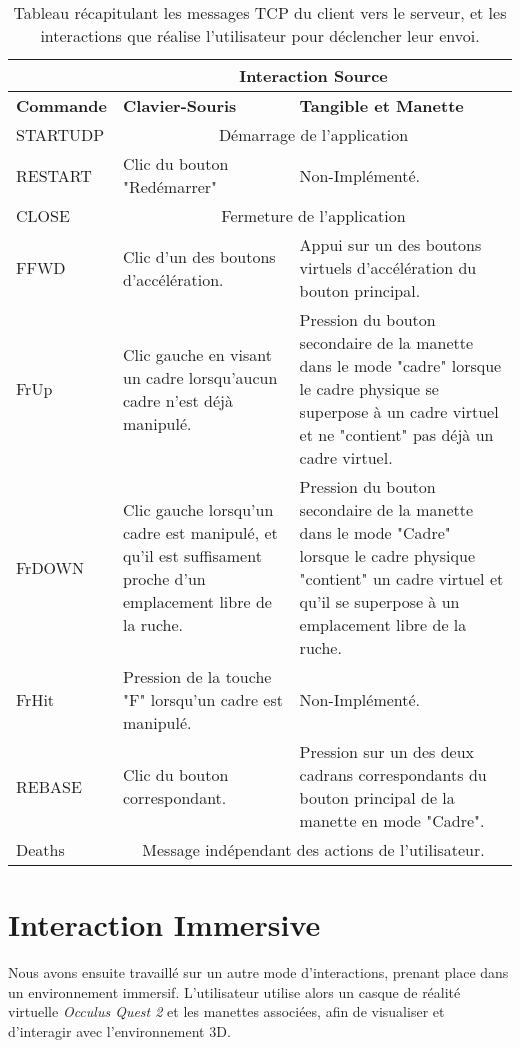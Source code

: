 	\begin{table}
		\begin{tabularx}{\textwidth}{|l|p{4.5cm}|X|}
		\hline
		 & \multicolumn{2}{c|}{\textbf{Interaction Source}}\\
		 \hline
		 \textbf{Commande} & \textbf{Clavier-Souris} & \textbf{Tangible et Manette}\\
		 \hline
		 STARTUDP & \multicolumn{2}{c|}{Démarrage de l'application}\\
		 \hline
		 RESTART & Clic du bouton "Redémarrer" & Non-Implémenté.\\
		 \hline
		 CLOSE & \multicolumn{2}{c|}{Fermeture de l'application}\\
		 \hline
		 FFWD & Clic d'un des boutons d'accélération. & Appui sur un des boutons virtuels d'accélération du bouton principal.\\
		 \hline
		 FrUp & Clic gauche en visant un cadre lorsqu'aucun cadre n'est déjà manipulé. & Pression du bouton secondaire de la manette dans le mode "cadre" lorsque le cadre physique se superpose à un cadre virtuel et ne "contient" pas déjà un cadre virtuel.\\
		 \hline
		 FrDOWN & Clic gauche lorsqu'un cadre est manipulé, et qu'il est suffisament proche d'un emplacement libre de la ruche. & Pression du bouton secondaire de la manette dans le mode "Cadre" lorsque le cadre physique "contient" un cadre virtuel et qu'il se superpose à un emplacement libre de la ruche.\\
		 \hline
		 FrHit & Pression de la touche "F" lorsqu'un cadre est manipulé. & Non-Implémenté.\\
		 \hline
		 REBASE & Clic du bouton correspondant. & Pression sur un des deux cadrans correspondants du bouton principal de la manette en mode "Cadre".\\
		 \hline
		 Deaths & \multicolumn{2}{c|}{Message indépendant des actions de l'utilisateur.}\\
		 \hline 
		\end{tabularx}
	\caption{Tableau récapitulant les messages TCP du client vers le serveur, et les interactions que réalise l'utilisateur pour déclencher leur envoi.}
	\label{tabTotalInterClient}
	\end{table}
		
		
		
	\section{Interaction Immersive}
	\label{immersionSansTangibles}
		Nous avons ensuite travaillé sur un autre mode d'interactions, prenant place dans un environnement immersif. L'utilisateur utilise alors un casque de réalité virtuelle \textit{Occulus Quest 2} et les manettes associées, afin de visualiser et d'interagir avec l'environnement 3D.
		
